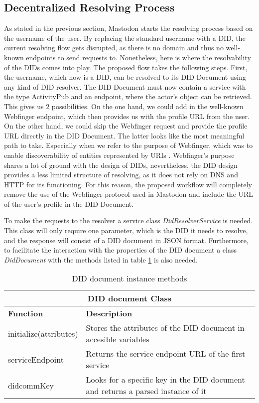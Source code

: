 \subsection{Decentralized Resolving Process}
As stated in the previous section, Mastodon starts the resolving process based on the username of the user. By replacing the standard username with a DID, the current resolving flow gets disrupted, as there is no domain and thus no well-known endpoints to send requests to. Nonetheless, here is where the resolvability of the DIDs comes into play. The proposed flow takes the following steps. First, the username, which now is a DID, can be resolved to its DID Document using any kind of DID resolver. The DID Document must now contain a service with the type ActivityPub and an endpoint, where the actor's object can be retrieved. This gives us 2 possibilities. On the one hand, we could add in the well-known Webfinger endpoint, which then provides us with the profile URL from the user. On the other hand, we could skip the Webfinger request and provide the profile URL directly in the DID Document. The latter looks like the most meaningful path to take. Especially when we refer to the purpose of Webfinger, which was to enable discoverability of entities represented by URIs \cite{jones_salgueiro_jones_smarr_2013}. Webfinger's purpose shares a lot of ground with the design of DIDs, nevertheless, the DID design provides a less limited structure of resolving, as it does not rely on DNS and HTTP for its functioning. For this reason, the proposed workflow will completely remove the use of the  Webfinger protocol used in Mastodon and include the URL of the user's profile in the DID Document.
 
To make the requests to the resolver a service class \emph{DidResolverService} is needed. This class will only require one parameter, which is the DID it needs to resolve, and the response will consist of a DID document in JSON format. Furthermore, to facilitate the interaction with the properties of the DID document a class \emph{DidDocument} with the methods listed in table \ref{table:did_doc_instance_methods} is also needed.

\begin{table}[!ht]
	\centering
	\begin{tabular}{|p{5cm}|p{10cm}| }
    \hline
    \multicolumn{2}{|c|}{DID document Class} \\
    \hline
    \textbf{Function} & \textbf{Description} \\
		\hline
		\hline
      initialize(attributes) &  Stores the attributes of the DID document in accesible variables\\
    \hline
      serviceEndpoint & Returns the service endpoint URL of the first service \\
    \hline
      didcommKey & Looks for a specific key in the DID document and returns a parsed instance of it \\
    \hline
	\end{tabular}
	\caption{DID document instance methods}
  \label{table:did_doc_instance_methods}
\end{table}

